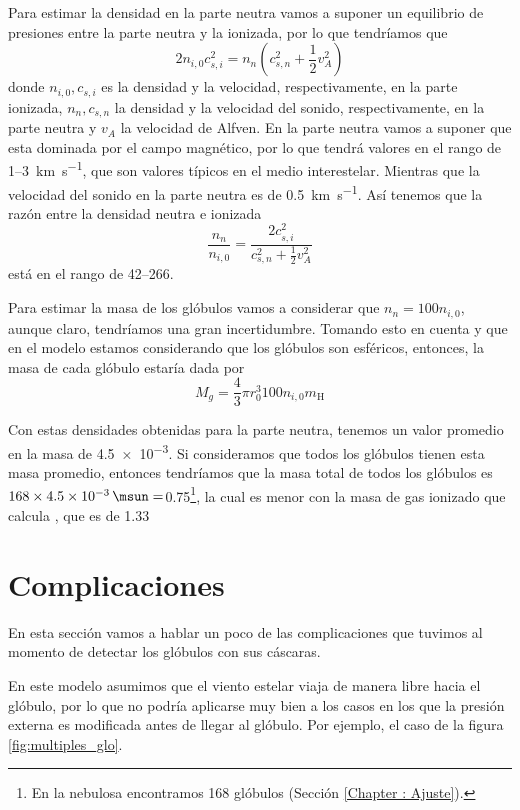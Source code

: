 \documentclass{book}
\begin{document}
Para estimar la densidad en la parte neutra vamos a suponer un equilibrio de presiones entre la parte neutra y la ionizada, por lo que tendríamos que
\begin{equation}
    2 n_{i,0}c_{s,i}^2 = n_n(c_{s,n}^2+\frac{1}{2}v_A^2)
\end{equation}
donde $n_{i,0}, c_{s,i}$ es la densidad y la velocidad, respectivamente, en la parte ionizada, $n_n, c_{s,n}$ la densidad y la velocidad del sonido, respectivamente, en la parte neutra y $v_A$ la velocidad de Alfven. En la parte neutra vamos a suponer que esta dominada por el campo magnético, por lo que tendrá valores en el rango de 1--\SI{3}{km.s^{-1}}, que son valores típicos en el medio interestelar. Mientras que la velocidad del sonido en la parte neutra es de \SI{0.5}{km.s^{-1}}. Así tenemos que la razón entre la densidad neutra e ionizada 
\begin{equation}
    \frac{n_n}{n_{i,0}}=\frac{2c_{s,i}^2}{c_{s,n}^2+\frac{1}{2}v_A^2}
\end{equation}
está en el rango de 42--266. 

Para estimar la masa de los glóbulos vamos a considerar que $n_n=100n_{i,0}$, aunque claro, tendríamos una gran incertidumbre. Tomando esto en cuenta y que en el modelo estamos considerando que los glóbulos son esféricos, entonces, la masa de cada glóbulo estaría dada por
\begin{equation}
    M_g = \frac{4}{3}\pi r_0^3 100n_{i,0} m_\mathrm{H}
\end{equation}

Con estas densidades obtenidas para la parte neutra, tenemos un valor promedio en la masa de \SI{4.5e-3}{\msun}.
Si consideramos que todos los glóbulos tienen esta masa promedio, entonces tendríamos que la masa total de todos los glóbulos es $168\times\SI{4.5e-3}{\msun}=$\SI{0.75}{\msun}\footnote{En la nebulosa encontramos 168 glóbulos (Sección \ref{Chapter : Ajuste}).}, la cual es menor con la masa de gas ionizado que calcula \cite{Grosdidier:1998}, que es de \SI{1.33}{\msun}

\section{Complicaciones }

En esta sección vamos a hablar un poco de las complicaciones que tuvimos al momento de detectar los glóbulos con sus cáscaras.

En este modelo asumimos que el viento estelar viaja de manera libre hacia el glóbulo, por lo que no podría aplicarse muy bien a los casos en los que la presión externa es modificada antes de llegar al glóbulo. Por ejemplo, el caso de la figura \ref{fig:multiples_glo}.
\end{document}
